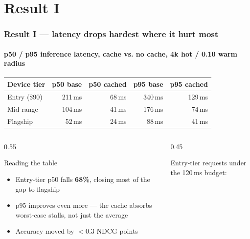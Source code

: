 \setcounter{secprog}{3}
\section{Result I}

\begin{frame}
  \frametitle{Result I --- latency drops hardest where it hurt most}
  \framesubtitle{p50 / p95 inference latency, cache vs. no cache, 4k hot / 0.10 warm radius}
  \begin{table}
    \centering
    \small
    \begin{tabular}{@{}lrrrr@{}}
      \toprule
      \textbf{Device tier} & \textbf{p50 base} & \textbf{p50 cached} & \textbf{p95 base} & \textbf{p95 cached} \\
      \midrule
      Entry (\$90)   & 211\,ms & 68\,ms  & 340\,ms & 129\,ms \\
      Mid-range      & 104\,ms & 41\,ms  & 176\,ms & 74\,ms  \\
      Flagship       & 52\,ms  & 24\,ms  & 88\,ms  & 41\,ms  \\
      \bottomrule
    \end{tabular}
  \end{table}
  \vspace{2mm}
  \small
  \begin{columns}[T]
    \begin{column}{0.55\textwidth}
      \begin{block}{Reading the table}
        \begin{itemize}
          \item Entry-tier p50 falls \textbf{68\%}, closing most of the gap to flagship
          \item p95 improves even more --- the cache absorbs worst-case stalls, not just the average
          \item Accuracy moved by $<$0.3 NDCG points
        \end{itemize}
      \end{block}
    \end{column}
    \begin{column}{0.45\textwidth}
      \begin{tcolorbox}[colback=mist,colframe=emberamber,boxrule=0.6pt,arc=2mm,title={\color{white}Budget check},colbacktitle=emberamber]
        Entry-tier requests under the 120\,ms budget:\\
         
      \end{tcolorbox}
    \end{column}
  \end{columns}
\end{frame}

